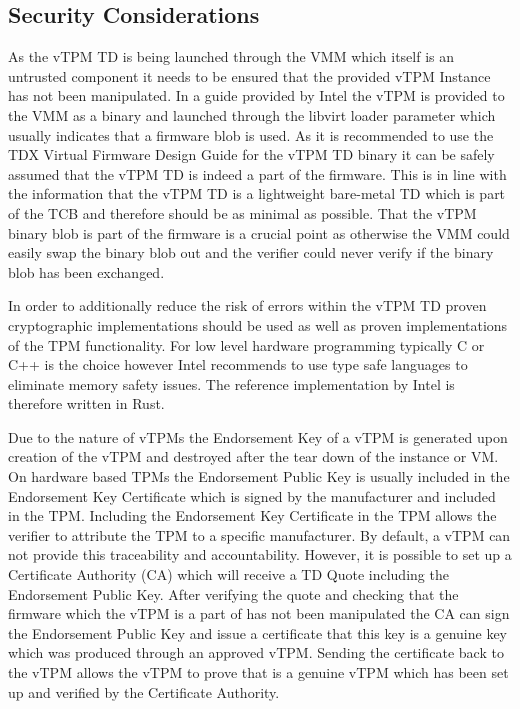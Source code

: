 \documentclass[sigplan,screen,nonacm]{acmart}
\begin{document}
\subsection{Security Considerations}
As the vTPM TD is being launched through the VMM which itself is an untrusted component it needs to be ensured that the provided vTPM Instance has not been manipulated.
In a guide provided by Intel the vTPM is provided to the VMM as a binary and launched through the libvirt loader parameter which usually indicates that a firmware blob is used\cite[p. 84]{Intel-linux-tdx}\cite{libvirt}.
As it is recommended to use the TDX Virtual Firmware Design Guide for the vTPM TD binary it can be safely assumed that the vTPM TD is indeed a part of the firmware\cite[p. 20]{Intel-vTPM}.
This is in line with the information that the vTPM TD is a lightweight bare-metal TD which is part of the TCB and therefore should be as minimal as possible\cite[p. 18]{Intel-vTPM}.
That the vTPM binary blob is part of the firmware is a crucial point as otherwise the VMM could easily swap the binary blob out and the verifier could never verify if the binary blob has been exchanged.

In order to additionally reduce the risk of errors within the vTPM TD proven cryptographic implementations should be used as well as proven implementations of the TPM functionality.
For low level hardware programming typically C or C++ is the choice however Intel recommends to use type safe languages to eliminate memory safety issues\cite[p. 20]{Intel-vTPM}.
The reference implementation by Intel is therefore written in Rust\cite[p. 20]{Intel-vTPM}.

Due to the nature of vTPMs the Endorsement Key of a vTPM is generated upon creation of the vTPM and destroyed after the tear down of the instance or VM.
On hardware based TPMs the Endorsement Public Key is usually included in the Endorsement Key Certificate which is signed by the manufacturer and included in the TPM.
Including the Endorsement Key Certificate in the TPM allows the verifier to attribute the TPM to a specific manufacturer.
By default, a vTPM can not provide this traceability and accountability.
However, it is possible to set up a Certificate Authority (CA) which will receive a TD Quote including the Endorsement Public Key.
After verifying the quote and checking that the firmware which the vTPM is a part of has not been manipulated the CA can sign the Endorsement Public Key and issue a certificate that this key is a genuine key which was produced through an approved vTPM.
Sending the certificate back to the vTPM allows the vTPM to prove that is a genuine vTPM which has been set up and verified by the Certificate Authority.
\end{document}
